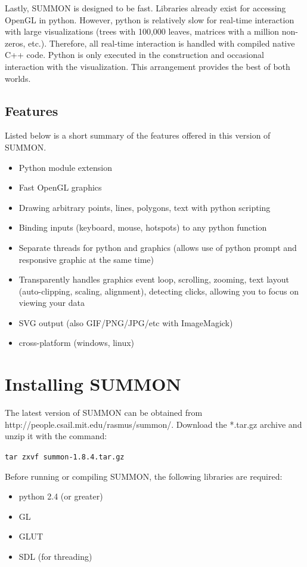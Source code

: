 \documentclass[12pt]{article}
\newcommand{\items}[1]{\begin{itemize} #1 \end{itemize}}
\newcommand{\codeblock}[1]{\vspace{.1in} {\tt #1} \vspace{.1in}}
\newcommand{\version}{1.8.4}
\begin{document}
Lastly, SUMMON is designed to be fast.  Libraries already exist for
accessing OpenGL in python.  However, python is relatively slow for real-time
interaction with large visualizations (trees with 100,000 leaves, matrices with
a million non-zeros, etc.).  Therefore, all real-time interaction is handled
with compiled native C++ code.  Python is only executed in the construction 
and occasional interaction with the visualization.  This arrangement provides 
the best of both worlds.




\subsection{Features}

Listed below is a short summary of the features offered in this version of
SUMMON.

\items{
    \item Python module extension
    \item Fast OpenGL graphics
    \item Drawing arbitrary points, lines, polygons, text with python scripting
    \item Binding inputs (keyboard, mouse, hotspots) to any python function 
    \item Separate threads for python and graphics (allows use of python prompt
          and responsive graphic at the same time)    
    \item Transparently handles graphics event loop, scrolling, zooming, text
          layout (auto-clipping, scaling, alignment), detecting clicks, allowing
          you to focus on viewing your data
    \item SVG output (also GIF/PNG/JPG/etc with ImageMagick)
    \item cross-platform (windows, linux)
}


\section{Installing SUMMON}
\label{sec:installing}

The latest version of SUMMON can be obtained from 
http://people.csail.mit.edu/rasmus/summon/.  Download the *.tar.gz archive and
unzip it with the command:

\codeblock{tar zxvf summon-\version.tar.gz}

Before running or compiling SUMMON, the following libraries are required:
\items {
    \item python 2.4 (or greater)
    \item GL   
    \item GLUT
    \item SDL (for threading)
}
\end{document}
